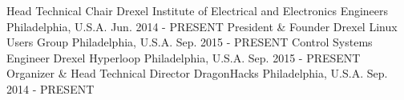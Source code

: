 \begin{cventries}
  \cventry
    {Head Technical Chair}
    {Drexel Institute of Electrical and Electronics Engineers}
    {Philadelphia, U.S.A.}
    {Jun. 2014 - PRESENT}
    { }
  \cventry
    {President \& Founder}
    {Drexel Linux Users Group}
    {Philadelphia, U.S.A.}
    {Sep. 2015 - PRESENT}
    { }
  \cventry
    {Control Systems Engineer}
    {Drexel Hyperloop}
    {Philadelphia, U.S.A.}
    {Sep. 2015 - PRESENT}
    { }
  \cventry
    {Organizer \& Head Technical Director}
    {DragonHacks}
    {Philadelphia, U.S.A.}
    {Sep. 2014 - PRESENT}
    { }
\end{cventries}
